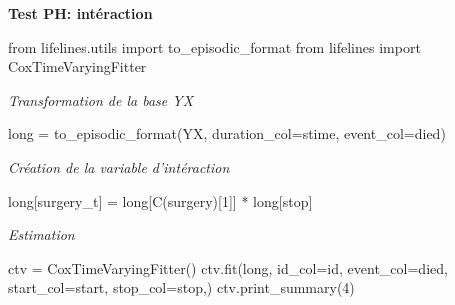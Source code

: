 \documentclass[
  12pt,
  letterpaper,
  DIV=11,
  numbers=noendperiod,
  onepage,
  openany]{scrreprt}
\newenvironment{Shaded}{\begin{snugshade}}{\end{snugshade}}
\newcommand{\BuiltInTok}[1]{\textcolor[rgb]{0.80,0.80,0.80}{#1}}
\newcommand{\DecValTok}[1]{\textcolor[rgb]{0.86,0.86,0.80}{#1}}
\newcommand{\ImportTok}[1]{\textcolor[rgb]{0.80,0.80,0.80}{#1}}
\newcommand{\NormalTok}[1]{\textcolor[rgb]{0.80,0.80,0.80}{#1}}
\newcommand{\OperatorTok}[1]{\textcolor[rgb]{0.94,0.94,0.82}{#1}}
\newcommand{\StringTok}[1]{\textcolor[rgb]{0.80,0.58,0.58}{#1}}
\begin{document}
\textbf{Test PH: intéraction}

\begin{Shaded}
\begin{Highlighting}[]
\ImportTok{from}\NormalTok{ lifelines.utils }\ImportTok{import}\NormalTok{ to\_episodic\_format}
\ImportTok{from}\NormalTok{ lifelines }\ImportTok{import}\NormalTok{ CoxTimeVaryingFitter}
\end{Highlighting}
\end{Shaded}

\emph{Transformation de la base YX}

\begin{Shaded}
\begin{Highlighting}[]
\BuiltInTok{long} \OperatorTok{=}\NormalTok{ to\_episodic\_format(YX, duration\_col}\OperatorTok{=}\StringTok{\textquotesingle{}stime\textquotesingle{}}\NormalTok{, event\_col}\OperatorTok{=}\StringTok{\textquotesingle{}died\textquotesingle{}}\NormalTok{)}
\end{Highlighting}
\end{Shaded}

\emph{Création de la variable d'intéraction}

\begin{Shaded}
\begin{Highlighting}[]
\BuiltInTok{long}\NormalTok{[}\StringTok{\textquotesingle{}surgery\_t\textquotesingle{}}\NormalTok{] }\OperatorTok{=} \BuiltInTok{long}\NormalTok{[}\StringTok{\textquotesingle{}C(surgery)[1]\textquotesingle{}}\NormalTok{] }\OperatorTok{*} \BuiltInTok{long}\NormalTok{[}\StringTok{\textquotesingle{}stop\textquotesingle{}}\NormalTok{]}
\end{Highlighting}
\end{Shaded}

\emph{Estimation}

\begin{Shaded}
\begin{Highlighting}[]
\NormalTok{ctv }\OperatorTok{=}\NormalTok{ CoxTimeVaryingFitter()}
\NormalTok{ctv.fit(}\BuiltInTok{long}\NormalTok{,}
\NormalTok{        id\_col}\OperatorTok{=}\StringTok{\textquotesingle{}id\textquotesingle{}}\NormalTok{,}
\NormalTok{        event\_col}\OperatorTok{=}\StringTok{\textquotesingle{}died\textquotesingle{}}\NormalTok{,}
\NormalTok{        start\_col}\OperatorTok{=}\StringTok{\textquotesingle{}start\textquotesingle{}}\NormalTok{,}
\NormalTok{        stop\_col}\OperatorTok{=}\StringTok{\textquotesingle{}stop\textquotesingle{}}\NormalTok{,)}
\NormalTok{ctv.print\_summary(}\DecValTok{4}\NormalTok{)}
\end{Highlighting}
\end{Shaded}
\end{document}
